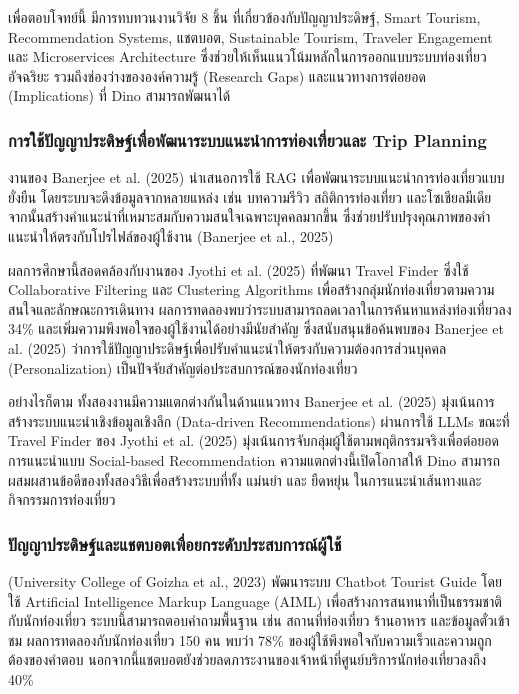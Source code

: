 เพื่อตอบโจทย์นี้ มีการทบทวนงานวิจัย 8 ชิ้น ที่เกี่ยวข้องกับปัญญาประดิษฐ์, Smart Tourism, Recommendation Systems, แชตบอต, Sustainable Tourism, Traveler Engagement และ Microservices Architecture ซึ่งช่วยให้เห็นแนวโน้มหลักในการออกแบบระบบท่องเที่ยวอัจฉริยะ รวมถึงช่องว่างขององค์ความรู้ (Research Gaps) และแนวทางการต่อยอด (Implications) ที่ Dino สามารถพัฒนาได้

\subsubsection{การใช้ปัญญาประดิษฐ์เพื่อพัฒนาระบบแนะนำการท่องเที่ยวและ Trip Planning}

งานของ Banerjee et al. (2025) นำเสนอการใช้ RAG เพื่อพัฒนาระบบแนะนำการท่องเที่ยวแบบยั่งยืน โดยระบบจะดึงข้อมูลจากหลายแหล่ง เช่น บทความรีวิว สถิติการท่องเที่ยว และโซเชียลมีเดีย จากนั้นสร้างคำแนะนำที่เหมาะสมกับความสนใจเฉพาะบุคคลมากขึ้น ซึ่งช่วยปรับปรุงคุณภาพของคำแนะนำให้ตรงกับโปรไฟล์ของผู้ใช้งาน (Banerjee et al., 2025)

ผลการศึกษานี้สอดคล้องกับงานของ Jyothi et al. (2025) ที่พัฒนา Travel Finder ซึ่งใช้ Collaborative Filtering และ Clustering Algorithms เพื่อสร้างกลุ่มนักท่องเที่ยวตามความสนใจและลักษณะการเดินทาง ผลการทดลองพบว่าระบบสามารถลดเวลาในการค้นหาแหล่งท่องเที่ยวลง 34\% และเพิ่มความพึงพอใจของผู้ใช้งานได้อย่างมีนัยสำคัญ ซึ่งสนับสนุนข้อค้นพบของ Banerjee et al. (2025) ว่าการใช้ปัญญาประดิษฐ์เพื่อปรับคำแนะนำให้ตรงกับความต้องการส่วนบุคคล (Personalization) เป็นปัจจัยสำคัญต่อประสบการณ์ของนักท่องเที่ยว

อย่างไรก็ตาม ทั้งสองงานมีความแตกต่างกันในด้านแนวทาง Banerjee et al. (2025) มุ่งเน้นการสร้างระบบแนะนำเชิงข้อมูลเชิงลึก (Data-driven Recommendations) ผ่านการใช้ LLMs ขณะที่ Travel Finder ของ Jyothi et al. (2025) มุ่งเน้นการจับกลุ่มผู้ใช้ตามพฤติกรรมจริงเพื่อต่อยอดการแนะนำแบบ Social-based Recommendation ความแตกต่างนี้เปิดโอกาสให้ Dino สามารถผสมผสานข้อดีของทั้งสองวิธีเพื่อสร้างระบบที่ทั้ง แม่นยำ และ ยืดหยุ่น ในการแนะนำเส้นทางและกิจกรรมการท่องเที่ยว

\subsubsection{ปัญญาประดิษฐ์และแชตบอตเพื่อยกระดับประสบการณ์ผู้ใช้}

(University College of Goizha et al., 2023) พัฒนาระบบ Chatbot Tourist Guide โดยใช้ Artificial Intelligence Markup Language (AIML) เพื่อสร้างการสนทนาที่เป็นธรรมชาติกับนักท่องเที่ยว ระบบนี้สามารถตอบคำถามพื้นฐาน เช่น สถานที่ท่องเที่ยว ร้านอาหาร และข้อมูลตั๋วเข้าชม ผลการทดลองกับนักท่องเที่ยว 150 คน พบว่า 78\% ของผู้ใช้พึงพอใจกับความเร็วและความถูกต้องของคำตอบ นอกจากนี้แชตบอตยังช่วยลดภาระงานของเจ้าหน้าที่ศูนย์บริการนักท่องเที่ยวลงถึง 40\%


